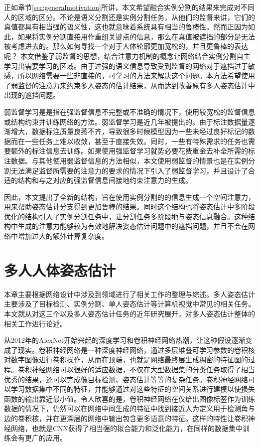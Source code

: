 正如章节\ref{sec:generalmotivation}所讲，本文希望融合实例分割的结果来完成对不同人的区域的区分。不论是语义分割还是实例分割任务，从他们的监督来讲，它们的真值都具有相当强的语义性，这也就意味着系统具有相当的鲁棒性。然而正因为如此，如果将实例分割直接用作重组关键点的信息，那么在真值被遮挡的部分是无法被考虑进去的。那么如何寻找一个对于人体轮廓更加宽松的，并且更鲁棒的表达呢？
本文借鉴了弱监督的思想，结合注意力机制的概念让网络结合实例分割自主学习出需要学习的区域。由于过强的语义信息导致受到监督的网络对于遮挡过于敏感，所以网络需要一些非直接的，可学习的方法来解决这个问题。本方法希望使用了弱监督的注意力来约束多人姿态的估计结果，从而达到改善原有多人姿态估计中出现的遮挡问题。

弱监督学习是是指在强监督信息不完整或不准确的情况下，使用较宽松的监督信息或结构约束并训练网络的方法\cite{10.1093/nsr/nwx106}。弱监督学习是近几年被提出的。由于标注数据量逐渐增大，数据标注质量良莠不齐，导致很多时候模型因为一些未经过良好标记的数据而在一些任务上难以收敛，甚至于直接失效。同时，一些有特殊需求的任务也需要额外的标注信息去训练。如果使用强监督学习就势必要花费重金去补全所需的标注数据。与其他使用弱监督信息的方法相似，本文使用弱监督的情景也是在实例分割无法满足监督所需要的注意力的要求的情况下引入了弱监督学习，并且设计了合适的结构和与之对应的强监督信息间接地约束注意力的生成。

因此，本文提出了全新的结构，旨在使用实例分割的的信息生成一个空间注意力，用来帮助姿态估计分支得到更加鲁棒的结果。同时这个结构也将姿态估计中多阶段优化的结构引入了实例分割任务中，让分割任务多阶段地与姿态信息融合。这种结构中生成的注意力能够较为有效地解决姿态估计问题中的遮挡问题，并且不会在网络中增加过大的额外计算复杂度。


\chapter{多人人体姿态估计}
\label{cha:related}
本章主要根据网络设计中涉及到领域进行了相关工作的整理与综述。多人姿态估计主要涉及了目标检测、实例分割、单人姿态估计等计算机视觉中常见的相关任务。本文就从对这三个以及多人姿态估计任务的近年研究展开，对多人姿态估计整体的相关工作进行论述。

从2012年的AlexNet\cite{alex2012alexnet}开始兴起的深度学习和卷积神经网络热潮，让这种假设逐渐变成了现实。卷积神经网络是一种深度神经网络，通过多层堆叠可学习参数的卷积核对数字图像进行卷积操作，从而在顶端，也就是网络最终层生成稠密的特征图的过程。卷积神经网络可以很好的适应数据，不仅在大型数据集的分类任务取得了相当优秀的结果，还可以完成像目标检测、姿态估计等等的复杂任务。卷积神经网络可以学习数据集中不同的特征，并能够通过对这些特征的空间关系进行建模以使损失函数的输出靠近最小值。令人欣喜的是，卷积神经网络在仅给出图像标签作为训练数据的情况下，仍然可以在网络中间生成的特征中找到接近人为定义用于检测角与边的卷积核，并在更深层的网络中输出包含更多语意的特征\cite{yosinski2015understanding}。这样的特性让卷积神经网络，也就是CNN获得了相当强的拟合能力和泛化能力，在同样的数据集中训练会有更广的应用。

